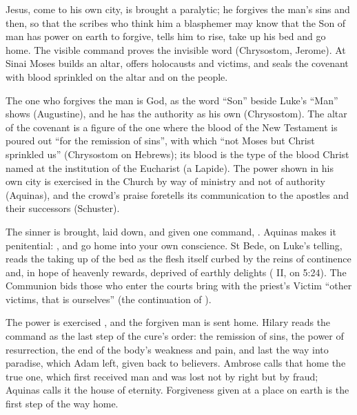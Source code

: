 \begin{fourSenses}
\item[Literal.] Jesus, come to his own city, is brought a paralytic; he forgives
the man's sins and then, so that the scribes who think him a blasphemer may know
that the Son of man has power on earth to forgive, tells him to rise, take up
his bed and go home. The visible command proves the invisible word (Chrysostom,
Jerome). At Sinai Moses builds an altar, offers holocausts and victims, and
seals the covenant with blood sprinkled on the altar and on the people.

\item[Allegorical.] The one who forgives the man is God, as the word ``Son''
beside Luke's ``Man'' shows (Augustine), and he has the authority as his own
(Chrysostom). The altar of the covenant is a figure of the one where the blood
of the New Testament is poured out ``for the remission of sins'', with which
``not Moses but Christ sprinkled us'' (Chrysostom on Hebrews); its blood is the
type of the blood Christ named at the institution of the Eucharist (a Lapide).
The power shown in his own city is exercised in the Church by way of ministry and
not of authority (Aquinas), and the crowd's praise foretells its communication
to the apostles and their successors (Schuster).

\item[Moral.] The sinner is brought, laid down, and given one command,
. Aquinas makes it penitential: , and go home into
your own conscience. St Bede, on Luke's telling,
reads the taking up of the bed as the flesh itself curbed by the reins of
continence and, in hope of heavenly rewards, deprived of earthly delights
( II, on 5:24). The Communion bids those who enter the courts bring
with the priest's Victim ``other victims, that is ourselves'' (the continuation
of ).

\item[Anagogical.] The power is exercised , and the forgiven
man is sent home. Hilary reads the command as the last step of the cure's
order: the remission of sins, the power of resurrection, the end of the body's
weakness and pain, and last the way into paradise, which Adam left, given back
to believers. Ambrose calls that home the true one, which first received man
and was lost not by right but by fraud; Aquinas calls it the house of
eternity. Forgiveness given at a place on earth is the first step of the way
home.
\end{fourSenses}
